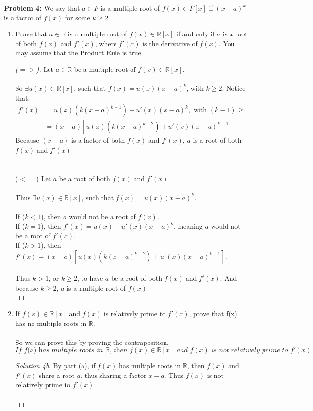 \documentclass[12pt]{article}
\begin{document}
\newpage 

\noindent \textbf{Problem 4: }We say that $a \in F$ is a multiple root of $f(x) \in F[x]$ if $(x - a)^k$ is a factor of $f(x)$ for some $k \geq 2$
	\\
	\begin{enumerate}[label = (\alph*)]
		\item Prove that $a \in \mathbb{R}$ is a multiple root of $f(x) \in \mathbb{R}[x]$ if and only if $a$ is a root of both $f(x)$ and $f'(x)$, where $f'(x)$ is the derivative of $f(x)$. You may assume that the Product Rule is true
		\begin{proof}[($=>$)]
			Let $a \in \mathbb{R}$ be a multiple root of $f(x) \in \mathbb{R}[x]$.
			\\ \\
			So $\exists u(x) \in \mathbb{R}[x]$, such that $f(x) = u(x)(x - a)^k$, with $k \geq 2$. Notice that: 
			\begin{align*}
			f'(x) &= u(x)(k(x - a)^{k-1}) + u'(x)(x - a)^k, \text{ with } (k-1) \geq 1 \\
			&= (x-a)\left[ u(x)(k(x - a)^{k-2}) + u'(x)(x - a)^{k-1} \right]
			\end{align*}
			Because $(x-a)$ is a factor of both $f(x)$ and $f'(x)$, $a$ is a root of both $f(x)$ and $f'(x)$ 
			\\ \\ \\
			($<=$) Let $a$ be a root of both $f(x)$ and $f'(x)$. 
			\\ \\
			Thus $\exists u(x) \in \mathbb{R}[x]$, such that $f(x) = u(x)(x - a)^k$. 
			\\ \\
			If ($k < 1$), then $a$ would not be a root of $f(x)$. \\
			If ($k = 1$), then $f'(x) = u(x) + u'(x)(x - a)^k$, meaning $a$ would not be a root of $f'(x)$. \\
			If ($k > 1$), then $f'(x) = (x-a)\left[ u(x)(k(x - a)^{k-2}) + u'(x)(x - a)^{k-1} \right]$. \\ 
			\\
			Thus $k > 1$, or $k \geq 2$, to have $a$ be a root of both $f(x)$ and $f'(x)$. And because $k \geq 2$, $a$ is a  multiple root of $f(x)$
			\\
		\end{proof}
		\item If $f(x) \in \mathbb{R}[x]$ and $f(x)$ is relatively prime to $f'(x)$, prove that f(x) has no multiple roots in $\mathbb{R}$.
		\\ \\
		So we can prove this by proving the contraposition. 
		$$
		\textit{If f(x) has multiple roots in $\mathbb{R}$, then $f(x) \in \mathbb{R}[x]$ and $f(x)$ is not relatively prime to $f'(x)$}
		$$
		\begin{proof}[Solution 4b]
			By part (a), if $f(x)$ has multiple roots in $\mathbb{R}$, then $f(x)$ and $f'(x)$ share a root $a$, thus sharing a factor $x-a$. Thus $f(x)$ is not relatively prime to $f'(x)$
			\\ \\
		\end{proof}
	\end{enumerate}
\end{document}
